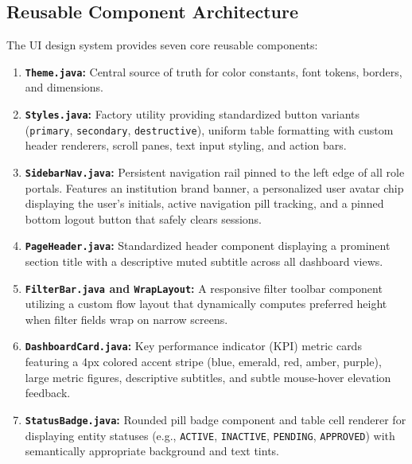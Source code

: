 \subsection{Reusable Component Architecture}
The UI design system provides seven core reusable components:
\begin{enumerate}
    \item \textbf{\texttt{Theme.java}:} Central source of truth for color constants, font tokens, borders, and dimensions.
    \item \textbf{\texttt{Styles.java}:} Factory utility providing standardized button variants (\texttt{primary}, \texttt{secondary}, \texttt{destructive}), uniform table formatting with custom header renderers, scroll panes, text input styling, and action bars.
    \item \textbf{\texttt{SidebarNav.java}:} Persistent navigation rail pinned to the left edge of all role portals. Features an institution brand banner, a personalized user avatar chip displaying the user's initials, active navigation pill tracking, and a pinned bottom logout button that safely clears sessions.
    \item \textbf{\texttt{PageHeader.java}:} Standardized header component displaying a prominent section title with a descriptive muted subtitle across all dashboard views.
    \item \textbf{\texttt{FilterBar.java} and \texttt{WrapLayout}:} A responsive filter toolbar component utilizing a custom flow layout that dynamically computes preferred height when filter fields wrap on narrow screens.
    \item \textbf{\texttt{DashboardCard.java}:} Key performance indicator (KPI) metric cards featuring a 4px colored accent stripe (blue, emerald, red, amber, purple), large metric figures, descriptive subtitles, and subtle mouse-hover elevation feedback.
    \item \textbf{\texttt{StatusBadge.java}:} Rounded pill badge component and table cell renderer for displaying entity statuses (e.g., \texttt{ACTIVE}, \texttt{INACTIVE}, \texttt{PENDING}, \texttt{APPROVED}) with semantically appropriate background and text tints.
\end{enumerate}

